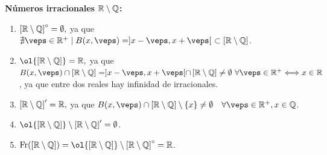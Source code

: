 \begin{ejercicio}
    \textbf{Números irracionales $\mathbb{R}\setminus \mathbb{Q}$:}
    \begin{enumerate}
        \item $\left[\mathbb{R}\setminus \mathbb{Q}\right]^\circ = \emptyset,$ ya que $\nexists \veps\in \bb{R}^+\mid B(x,\veps)=]x-\veps, x+\veps[~\subset \left[\bb{R}\setminus \bb{Q}\right]$.
        
        \item $\ol{\left[\bb{R}\setminus \bb{Q}\right]} = \bb{R},$ ya
        que $B(x,\veps)\cap \left[\bb{R}\setminus \bb{Q}\right] = ]x-\veps, x+\veps[\cap \left[\bb{R}\setminus \bb{Q}\right]\neq \emptyset ~\forall \veps\in \bb{R}^+ \Longleftrightarrow x\in \bb{R}$, ya que entre dos reales hay infinidad de irracionales.
        
        \item $\left[\mathbb{R}\setminus \mathbb{Q}\right]' = \mathbb{R},$ ya que $B(x,\veps)\cap \left[\bb{R}\setminus \bb{Q}\right]\setminus\{x\} \neq \emptyset \quad \forall \veps\in \bb{R}^+, x\in \bb{Q}$.
        
        \item $\ol{\left[\bb{R}\setminus \bb{Q}\right]}\setminus \left[\bb{R}\setminus \bb{Q}\right]' =\emptyset$.
        
        \item $\Fr(\left[\bb{R}\setminus \bb{Q}\right])=\ol{\left[\bb{R}\setminus \bb{Q}\right]}\setminus 
        \left[\bb{R}\setminus \bb{Q}\right]^\circ=\bb{R}$.
    \end{enumerate}
\end{ejercicio}




